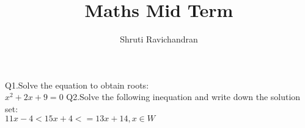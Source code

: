 \documentclass[12pt]{article}
\begin{document}
	\title{Maths Mid Term}
	\author{Shruti Ravichandran}
	\maketitle
	\newpage
	
Q1.Solve the equation to obtain roots:\\
		$x^2+2x+9=0$
	Q2.Solve the following inequation and write down the solution set:
	\\
		$11x-4<15x+4<=13x+14,x\in W$
	
\end{document}
